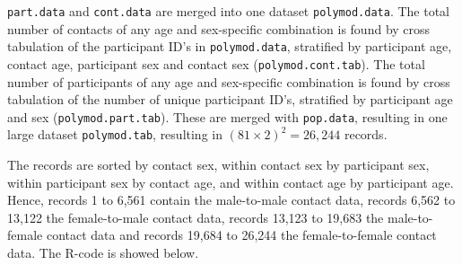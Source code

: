\documentclass[aoas,preprint]{imsart}
\numberwithin{equation}{section}
\begin{document}
\texttt{part.data} and \texttt{cont.data} are merged into one dataset \texttt{polymod.data}. The total number of contacts of any age and sex-specific combination is found by cross tabulation of the participant ID's in \texttt{polymod.data}, stratified by participant age, contact age, participant sex and contact sex (\texttt{polymod.cont.tab}). The total number of participants of any age and sex-specific combination is found by cross tabulation of the number of unique participant ID’s, stratified by participant age and sex (\texttt{polymod.part.tab}). These are merged with \texttt{pop.data}, resulting in one large dataset \texttt{polymod.tab}, resulting in $(81 \times 2)^2 = 26,244$ records.

The records are sorted by contact sex, within contact sex by participant sex, within participant sex by contact age, and within contact age by participant age. Hence, records 1 to 6,561 contain the male-to-male contact data, records 6,562 to 13,122 the female-to-male contact data, records 13,123 to 19,683 the male-to-female contact data and records 19,684 to 26,244 the female-to-female contact data. The R-code is showed below.
\end{document}
